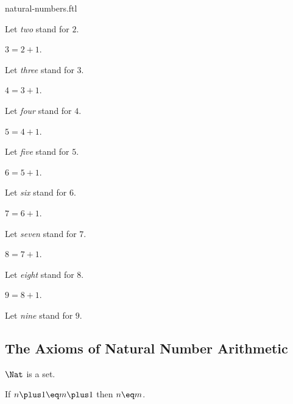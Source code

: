 \documentclass{naproche-library}
\begin{document}
\begin{smodule}{natural-numbers.ftl}
\begin{definition}[forthel,id=TwoSig]
    Let \emph{two} stand for $2$.
  \end{definition}

  \begin{definition}[forthel,id=ThreeSig]
    $3=2\plus1$.

    Let \emph{three} stand for $3$.
  \end{definition}

  \begin{definition}[forthel,id=FourSig]
    $4=3\plus1$.

    Let \emph{four} stand for $4$.
  \end{definition}

  \begin{definition}[forthel,id=FiveSig]
    $5=4\plus1$.

    Let \emph{five} stand for $5$.
  \end{definition}

  \begin{definition}[forthel,id=SixSig]
    $6=5\plus1$.

    Let \emph{six} stand for $6$.
  \end{definition}

  \begin{definition}[forthel,id=SevenSig]
    $7=6\plus1$.

    Let \emph{seven} stand for $7$.
  \end{definition}

  \begin{definition}[forthel,id=EightSig]
    $8=7\plus1$.

    Let \emph{eight} stand for $8$.
  \end{definition}

  \begin{definition}[forthel,id=NineSig]
    $9=8\plus1$.

    Let \emph{nine} stand for $9$.
  \end{definition}


  \subsection{The Axioms of Natural Number Arithmetic}

  \begin{axiom}[forthel,title=Infinity Axiom,id=NatIsSetAx]
    $\Nat$ is a set.
  \end{axiom}

  \begin{axiom}[forthel,title=Peano Axiom I,id=PlusIsInjectiveAx]
    If $n\plus1\eq m\plus1$ then $n\eq m$.
  \end{axiom}


\end{smodule}
\end{document}
